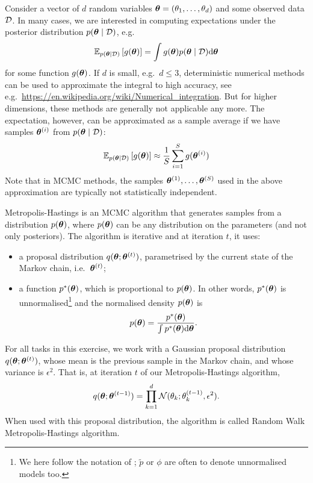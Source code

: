 Consider a vector of $d$ random variables $\boldsymbol{\theta} = (\theta_1, \dots, \theta_d)$ and some observed data $\mathcal{D}$.
%
In many cases, we are interested in computing expectations under
the posterior distribution $p(\boldsymbol{\theta} \mid \mathcal{D})$, e.g.\
\begin{equation}
  \mathbb{E}_{p(\boldsymbol{\theta} \mid \mathcal{D})}\left[g(\boldsymbol{\theta})\right] = \int g(\boldsymbol{\theta}) p(\boldsymbol{\theta} \mid \mathcal{D}) \mathrm{d} \boldsymbol{\theta}
\end{equation}
for some function $g(\boldsymbol{\theta})$. If $d$ is small, e.g.\ $d \le3$, deterministic
numerical methods can be used to approximate the integral to high accuracy, see
e.g.\ \url{https://en.wikipedia.org/wiki/Numerical_integration}. But for higher
dimensions, these methods are generally not applicable any more. The
expectation, however, can be approximated as a sample average if we have samples
$\boldsymbol{\theta}^{(i)}$ from $p(\boldsymbol{\theta} \mid \mathcal{D})$:
\begin{equation}
\mathbb{E}_{p(\boldsymbol{\theta} \mid \mathcal{D})}\left[g(\boldsymbol{\theta})\right] \approx \frac{1}{S}\sum_{i=1}^{S} g(\boldsymbol{\theta}^{(i)})
\end{equation}
Note that in MCMC methods, the samples $\boldsymbol{\theta}^{(1)}, \ldots, \boldsymbol{\theta}^{(S)}$ used in the above
approximation are typically not statistically independent.

Metropolis-Hastings is an MCMC algorithm that generates samples from a
distribution $p(\boldsymbol{\theta})$, where $p(\boldsymbol{\theta})$ can be any distribution
on the parameters (and not only posteriors). The algorithm is iterative
and at iteration $t$, it uses:
\begin{itemize}
\item a proposal distribution $q(\boldsymbol{\theta}; \boldsymbol{\theta}^{(t)})$, parametrised by the
	current state of the Markov chain, i.e.\ $\boldsymbol{\theta}^{(t)}$;
\item a function $p^*(\boldsymbol{\theta})$, which is proportional to $p(\boldsymbol{\theta})$. In other
  words, $p^*(\boldsymbol{\theta})$ is unnormalised\footnote{We here follow the notation of \citet{Barber2012}; $\tilde{p}$ or $\phi$ are often to denote unnormalised models too.} and the normalised density
  $p(\boldsymbol{\theta})$ is
  \begin{equation} p(\boldsymbol{\theta}) = \frac{p^*(\boldsymbol{\theta})}{\int p^*(\boldsymbol{\theta}) \mathrm{d}\boldsymbol{\theta}}.
  \end{equation}
\end{itemize} 
For all tasks in this exercise, we work with a Gaussian proposal distribution
$q(\boldsymbol{\theta}; \boldsymbol{\theta}^{(t)})$, whose mean is the previous sample in the Markov
chain, and whose variance is $\epsilon^2$. That is, at iteration $t$ of our
Metropolis-Hastings algorithm,
\begin{equation}
  q(\boldsymbol{\theta}; \boldsymbol{\theta}^{(t-1)}) = \prod_{k=1}^d\mathcal{N}(\theta_k; \theta_k^{(t-1)}, \epsilon^2).
  \label{eq:gauss-prop}
\end{equation}
When used with this proposal distribution, the algorithm is
called Random Walk Metropolis-Hastings algorithm.
%


